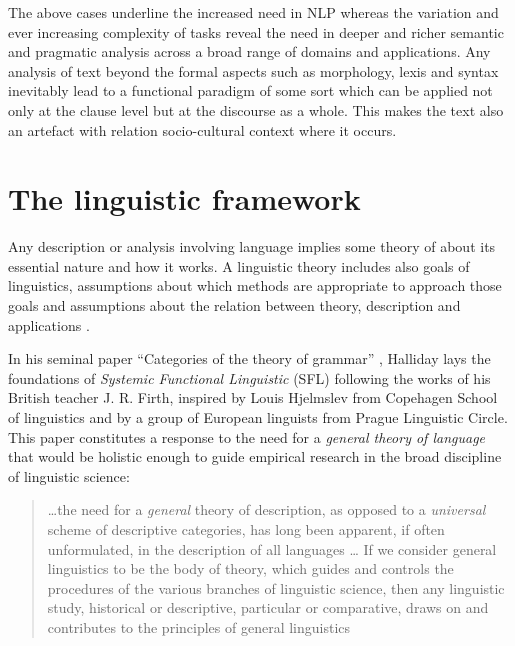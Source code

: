 The above cases underline the increased need in NLP whereas the variation and ever increasing complexity of tasks reveal the need in deeper and richer semantic and pragmatic analysis across a broad range of domains and applications. Any analysis of text beyond the formal aspects such as morphology, lexis and syntax inevitably lead to a functional paradigm of some sort which can be applied not only at the clause level but at the discourse as a whole. This makes the text also an artefact with relation socio-cultural context where it occurs. 

\section{The linguistic framework}
\label{sec:framework}
Any description or analysis involving language implies some theory of about its essential nature and how it works. A linguistic theory includes also goals of linguistics, assumptions about which methods are appropriate to approach those goals and assumptions about the relation between theory, description and applications \citep[3]{Fawcett2000}. 

In his seminal paper ``Categories of the theory of grammar'' \citep{Halliday61-orig}, Halliday lays the foundations of \textit{Systemic Functional Linguistic} (SFL) following the works of his British teacher J. R. Firth, inspired by Louis Hjelmslev \citep{Hjelmslev53} from Copehagen School of linguistics and by a group of European linguists from Prague Linguistic Circle. This paper constitutes a response to the need for a \textit{general theory of language} that would be holistic enough to guide empirical research in the broad discipline of linguistic science:
\begin{quotation}
    \dots the need for a \textit{general} theory of description, as opposed to a \textit{universal} scheme of descriptive categories, has long been apparent, if often unformulated, in the description of all languages \citep[54; emphasis in original]{Halliday57}
    \dots
    If we consider general linguistics to be the body of theory, which guides and controls the procedures of the various branches of linguistic science, then any linguistic study, historical or descriptive, particular or comparative, draws on and contributes to the principles of general linguistics \citep[55]{Halliday57}
\end{quotation} 



